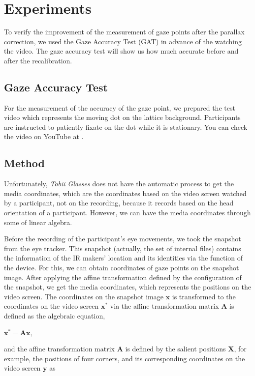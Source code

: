 \documentclass{article}
\begin{document}
\section{Experiments}

To verify the improvement of the measurement of gaze points after the parallax correction, we used the Gaze Accuracy Test (GAT) in advance of the watching the video. The gaze accuracy test will show us how much accurate before and after the recalibration.

\subsection{Gaze Accuracy Test}
For the measurement of the accuracy of the gaze point, we prepared the test video which represents the moving dot on the lattice background. Participants are instructed to patiently fixate on the dot while it is stationary. You can check the video on YouTube at \citet{GAT}.

\subsection{Method}
Unfortunately, \textit{Tobii Glasses} does not have the automatic process to get the media coordinates, which are the coordinates based on the video screen watched by a participant, not on the recording, because it records based on the head orientation of a participant. However, we can have the media coordinates through some of linear algebra.

Before the recording of the participant's eye movements, we took the snapshot from the eye tracker. This snapshot (actually, the set of internal files) contains the information of the IR makers' location and its identities via the function of the device. For this, we can obtain coordinates of gaze points on the snapshot image. After applying the affine transformation defined by the configuration of the snapshot, we get the media coordinates, which represents the positions on the video screen. The coordinates on the snapshot image $\mathbf{x}$ is transformed to the coordinates on the video screen $\mathbf{x^\ast}$ via the affine transformation matrix $\mathbf{A}$ is defined as the algebraic equation, 

\begin{center}
$\mathbf{x^\ast} = \mathbf{Ax},$\\
\end{center}

and the affine transformation matrix $\mathbf{A}$ is defined by the salient positions $\mathbf{X}$, for example, the positions of four corners, and its corresponding coordinates on the video screen $\mathbf{y}$ as
\end{document}
